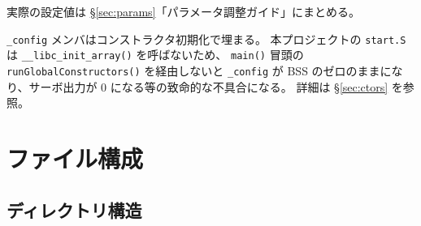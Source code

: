 \documentclass[a4paper,11pt,dvipdfmx]{jsarticle}
\begin{document}
実際の設定値は \hyperref[sec:params]{§\ref*{sec:params}}「パラメータ調整ガイド」にまとめる。

\begin{cautionbox}
\texttt{\_config} メンバはコンストラクタ初期化で埋まる。
本プロジェクトの \texttt{start.S} は \texttt{\_\_libc\_init\_array()} を呼ばないため、
\texttt{main()} 冒頭の \texttt{runGlobalConstructors()} を経由しないと
\texttt{\_config} が BSS のゼロのままになり、サーボ出力が 0 になる等の致命的な不具合になる。
詳細は \hyperref[sec:ctors]{§\ref*{sec:ctors}} を参照。
\end{cautionbox}

\section{ファイル構成}\label{sec:files}

\subsection{ディレクトリ構造}
\end{document}
